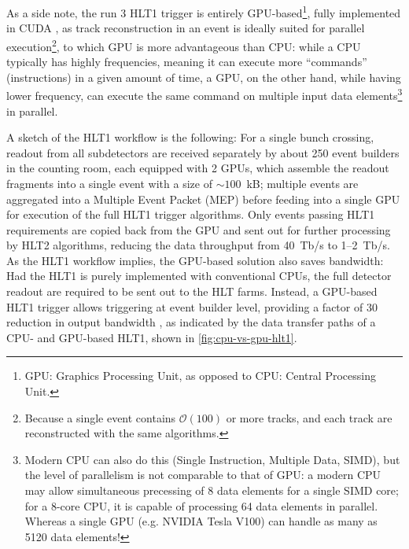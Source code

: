 As a side note, the run 3 HLT1 trigger is entirely GPU-based\footnote{
    GPU: Graphics Processing Unit, as opposed to CPU: Central Processing Unit.
}, fully implemented
in CUDA \cite{Allen_GPU_2020},
as track reconstruction in an event is ideally suited for parallel
execution\footnote{
    Because a single event contains $\mathcal{O}(100)$ or more tracks,
    and each track are reconstructed with the same algorithms.
},
to which GPU is more advantageous than CPU:
while a CPU typically has highly frequencies, meaning it can execute more
``commands'' (instructions) in a given amount of time,
a GPU, on the other hand, while having lower frequency, can execute the same
command on multiple input data elements\footnote{
    Modern CPU can also do this (Single Instruction, Multiple Data, SIMD),
    but the level of parallelism is not comparable to that of GPU:
    a modern CPU may allow simultaneous precessing of 8 data elements for a
    single SIMD core;
    for a 8-core CPU, it is capable of processing 64 data elements in parallel.
    Whereas a single GPU (e.g. NVIDIA Tesla V100) can handle as many as 5120
    data elements!
} in parallel.

A sketch of the HLT1 workflow is the following:
For a single bunch crossing,
readout from all subdetectors are received separately by about 250 event
builders in the counting room,
each equipped with 2 GPUs, which assemble the readout fragments into a single
event with a size of $\sim\!100$~kB;
multiple events are aggregated into a Multiple Event Packet (MEP) before feeding
into a single GPU for execution of the full HLT1 trigger algorithms.
Only events passing HLT1 requirements are copied back from the GPU and sent out
for further processing by HLT2 algorithms, reducing the data throughput
from 40~Tb/s to 1--2~Tb/s.
As the HLT1 workflow implies, the GPU-based solution also saves bandwidth:
Had the HLT1 is purely implemented with conventional CPUs,
the full detector readout are required to be sent out to the HLT farms.
Instead, a GPU-based HLT1 trigger allows triggering at event builder level,
providing a factor of 30 reduction in output bandwidth \cite{Allen_GPU_2020},
as indicated by the data transfer paths of a CPU- and GPU-based HLT1,
shown in \cref{fig:cpu-vs-gpu-hlt1}.

